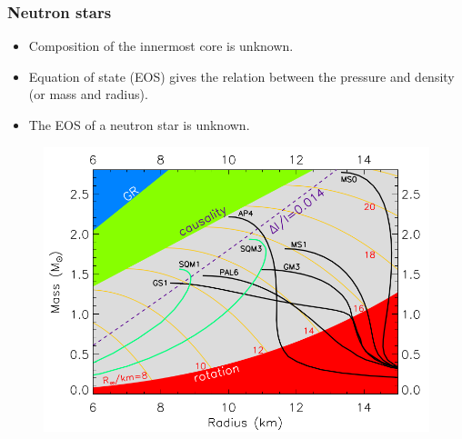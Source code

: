 \documentclass{beamer}
\begin{document}

\begin{frame}
\frametitle{Neutron stars}
\begin{minipage}{0.5\textwidth}
\begin{itemize}
\item Composition of the innermost core is unknown.
\item Equation of state (EOS) gives the relation between the pressure and density (or mass and radius).
\item The EOS of a neutron star is unknown.
\end{itemize}
\end{minipage}%
\begin{minipage}{.5\textwidth}
\begin{figure}
\includegraphics[width=1.1\linewidth]{eos_mr.png}
\end{figure}
\end{minipage}
\end{frame}




\end{document}

